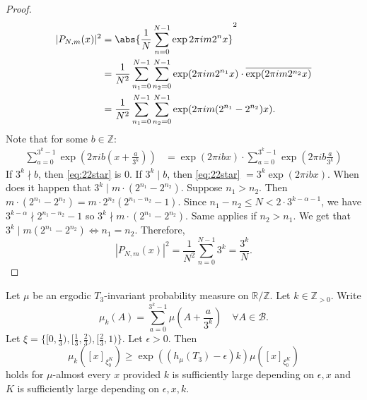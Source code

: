 \documentclass{article}
\newcommand{\B}{\mathcal{B}}
\begin{document}
\begin{proof}
  \begin{align*}
    |P_{N,m}(x)|^2 &= \abs{\frac{1}{N} \sum_{n=0}^{N-1} \exp{2 \pi i m 2^n x}}^2 \\
                   &= \frac{1}{N^2} \sum_{n_1=0}^{N-1} \sum_{n_2=0}^{N-1} \exp(2 \pi i m 2^{n_1} x) \cdot \overline{\exp(2 \pi i m 2^{n_2} x)} \\
                   &= \frac{1}{N^2} \sum_{n_1=0}^{N-1} \sum_{n_2=0}^{N-1} \exp(2 \pi i m (2^{n_1} - 2^{n_2}) x).
  \end{align*}
  Note that for some $b \in \mathbb{Z}$:
  \begin{align*}
    \sum_{a=0}^{3^k-1} \exp(2 \pi i b(x + \frac{a}{3^k})) &= \exp(2\pi i b x) \cdot \sum_{a=0}^{3^k - 1} \exp(2\pi i b \frac{a}{3^k}) \tag{$*$} \label{eq:22star}
  \end{align*}
  If $3^k \nmid b$, then \eqref{eq:22star} is 0. If $3^k \mid b$, then \eqref{eq:22star} $=3^k \exp(2 \pi i b x).$
  When does it happen that $3^k \mid m \cdot (2^{n_1} - 2^{n_2})$.
  Suppose $n_1 > n_2$. Then $m \cdot (2^{n_1} - 2^{n_2}) = m \cdot 2^{n_2} (2^{n_1 - n_2} - 1)$.
  Since $n_1 - n_2 \leq N < 2 \cdot 3^{k - \alpha - 1}$, we have $3^{k-\alpha} \nmid 2^{n_1 - n_2} - 1$ so $3^k \nmid m \cdot (2^{n_1} - 2^{n_2})$.
  Same applies if $n_2 > n_1$.
  We get that $3^k \mid m (2^{n_1} - 2^{n_2}) \iff n_1 = n_2$.
  Therefore,
  \begin{equation*}
    |P_{N,m}(x)|^2 = \frac{1}{N^2} \sum_{n=0}^{N-1} 3^k = \frac{3^k}{N}.
  \end{equation*}
\end{proof}
\begin{prop}
  Let $\mu$ be an ergodic $T_3$-invariant probability measure on $\mathbb{R}/\mathbb{Z}$.
  Let $k \in \mathbb{Z}_{>0}$.
  Write
  \begin{equation*}
    \mu_k(A) = \sum_{a=0}^{3^k-1} \mu(A + \frac{a}{3^k}) \quad \forall A \in \B.
  \end{equation*}
  Let $\xi = \{[0, \frac{1}{3}), [\frac{1}{3},\frac 23), [\frac 23, 1)\}$.
  Let $\epsilon > 0$. Then
  \begin{equation*}
    \mu_k([x]_{\xi_0^K}) \geq \exp((h_\mu(T_3) - \epsilon) k) \mu([x]_{\xi_0^K})
  \end{equation*}
  holds for $\mu$-almost every $x$ provided $k$ is sufficiently large depending on $\epsilon,x$ and $K$ is sufficiently large depending on $\epsilon,x,k$.
\end{prop}
\end{document}
